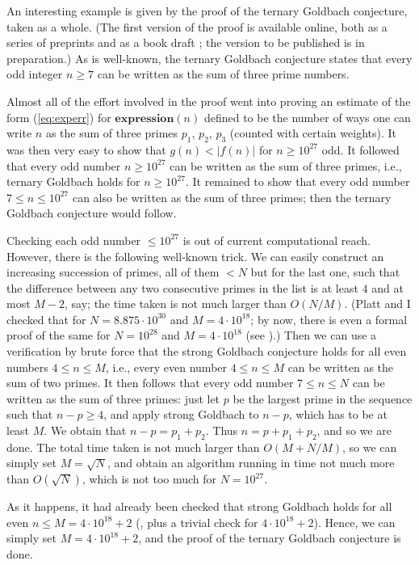   An interesting example is given by the proof of the
  ternary Goldbach conjecture, taken as a whole.
  (The first version of the proof is available online, both
  as a series of preprints and as a book draft \cite{Helfbook}; the
  version to be published is in preparation.)
  As is well-known,
  the ternary Goldbach conjecture states that every odd integer $n\geq 7$ can
  be written as the sum of three prime numbers.

  Almost all of the effort involved in the proof went into proving an estimate
  of the form (\ref{eq:experr}) for $\textbf{expression}(n)$ defined
  to be the number of ways one can write $n$ as the sum of three primes
  $p_1$, $p_2$, $p_3$ (counted with certain weights). It was then very
  easy to show that $g(n)<|f(n)|$ for $n\geq 10^{27}$ odd. It followed
  that every odd number $n\geq 10^{27}$ can be written as the
  sum of three primes, i.e., ternary Goldbach holds for $n\geq 10^{27}$.
  It remained to show that every odd number $7\leq n\leq 10^{27}$ can also be
  written as the sum of three primes; then the ternary Goldbach conjecture
  would follow.

  Checking each odd number $\leq 10^{27}$ is out of current computational reach.
  However, there is the following well-known trick. We can easily construct
  an increasing succession of primes, all of them $<N$ but for the last
  one, such that the difference between any two consecutive primes in the list
  is at least $4$ and at
  most $M-2$, say; the time taken is not much larger than $O(N/M)$.
  (Platt and I checked that for $N = 8.875\cdot 10^{30}$ and
  $M = 4\cdot 10^{18}$; by now, there is even a formal proof of the same
  for $N=10^{28}$ and $M=4\cdot 10^{18}$ (see \cite{ThGr}).) Then we can use a
  verification by brute force
  that the strong Goldbach conjecture holds for all even
  numbers $4\leq n\leq M$, i.e., every even number $4\leq n\leq M$ can be
  written as the sum of two primes. It then follows that every odd number
  $7\leq n\leq N$ can be written as the sum of three primes: just let $p$
  be the largest prime in the sequence such that $n-p\geq 4$, and apply
  strong Goldbach to $n-p$, which has to be at least $M$. We obtain that
  $n-p=p_1 + p_2$.
  Thus $n = p + p_1 + p_2$, and so we are done. The total time taken is
  not much larger than $O(M+N/M)$, so we can simply set $M=\sqrt{N}$,
  and obtain an algorithm running in time not much more than $O(\sqrt{N})$,
  which is not too much for $N=10^{27}$.
  
  As it happens, it had already been checked that strong Goldbach holds for
  all even $n\leq M = 4\cdot 10^{18}+2$ (\cite{e2014empirical},
  plus a trivial check for
  $4\cdot 10^{18}+2$). Hence, we can simply set $M=4\cdot 10^{18}+2$, and the proof
  of the ternary Goldbach conjecture is done.

